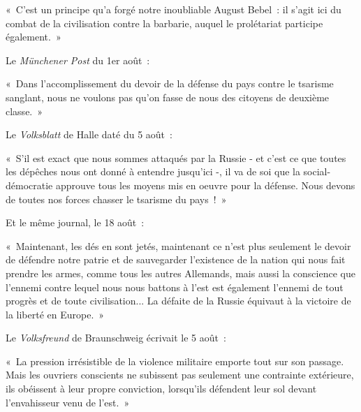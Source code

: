 \documentclass[french,twoside]{book} %
\newenvironment{quoteblock}%
  {\begin{quoting}}
  {\end{quoting}}
\newenvironment{quotebar}{%
    \def\FrameCommand{{\color{rubric!10!}\vrule width 0.5em} \hspace{0.9em}}%
    \def\OuterFrameSep{\itemsep} %
    \MakeFramed {\advance\hsize-\width \FrameRestore}
  }%
  {%
    \endMakeFramed
  }
\renewenvironment{quoteblock}%
  {%
    \savenotes
    \setstretch{0.9}
    \normalfont
    \begin{quotebar}
  }
  {%
    \end{quotebar}
    \spewnotes
  }
\begin{document}
\begin{quoteblock}
 \noindent « C'est un principe qu’a forgé notre inoubliable August Bebel : il s’agit ici du combat de la civilisation contre la barbarie, auquel le prolétariat participe également. »
\end{quoteblock}

\noindent Le \emph{Münchener Post} du 1er août :\par

\begin{quoteblock}
 \noindent « Dans l’accomplissement du devoir de la défense du pays contre le tsarisme sanglant, nous ne voulons pas qu’on fasse de nous des citoyens de deuxième classe. »
\end{quoteblock}

\noindent Le \emph{Volksblatt} de Halle daté du 5 août :\par

\begin{quoteblock}
 \noindent « S'il est exact que nous sommes attaqués par la Russie - et c’est ce que toutes les dépêches nous ont donné à entendre jusqu’ici -, il va de soi que la social-démocratie approuve tous les moyens mis en oeuvre pour la défense. Nous devons de toutes nos forces chasser le tsarisme du pays ! »
\end{quoteblock}

\noindent Et le même journal, le 18 août :\par

\begin{quoteblock}
 \noindent « Maintenant, les dés en sont jetés, maintenant ce n’est plus seulement le devoir de défendre notre patrie et de sauvegarder l’existence de la nation qui nous fait prendre les armes, comme tous les autres Allemands, mais aussi la conscience que l’ennemi contre lequel nous nous battons à l’est est également l’ennemi de tout progrès et de toute civilisation... La défaite de la Russie équivaut à la victoire de la liberté en Europe. »
\end{quoteblock}

\noindent Le \emph{Volksfreund} de Braunschweig écrivait le 5 août :\par

\begin{quoteblock}
 \noindent « La pression irrésistible de la violence militaire emporte tout sur son passage. Mais les ouvriers conscients ne subissent pas seulement une contrainte extérieure, ils obéissent à leur propre conviction, lorsqu’ils défendent leur sol devant l’envahisseur venu de l’est. »
\end{quoteblock}
\end{document}
